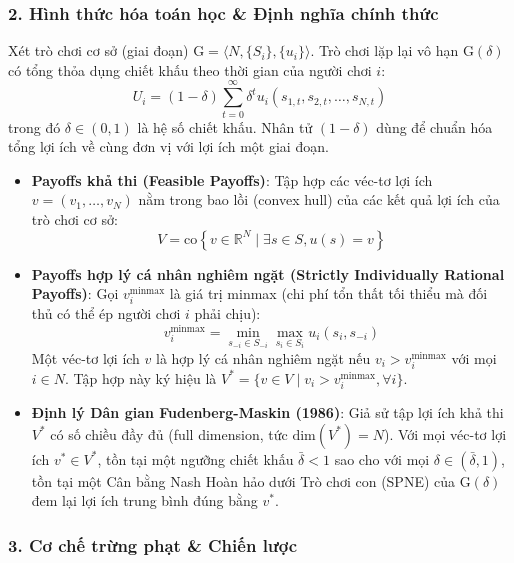 \documentclass[
]{article}
\begin{document}
\subsubsection{2. Hình thức hóa toán học \& Định nghĩa chính
thức}\label{huxecnh-thux1ee9c-huxf3a-touxe1n-hux1ecdc-ux111ux1ecbnh-nghux129a-chuxednh-thux1ee9c-1}

Xét trò chơi cơ sở (giai đoạn)
\(\text{G} = \langle N, \{S_i\}, \{u_i\} \rangle\). Trò chơi lặp lại vô
hạn \(\text{G}(\delta)\) có tổng thỏa dụng chiết khấu theo thời gian của
người chơi \(i\):
\[ U_i = (1 - \delta) \sum_{t=0}^{\infty} \delta^t u_i(s_{1,t}, s_{2,t}, \dots, s_{N,t}) \]
trong đó \(\delta \in (0,1)\) là hệ số chiết khấu. Nhân tử
\((1 - \delta)\) dùng để chuẩn hóa tổng lợi ích về cùng đơn vị với lợi
ích một giai đoạn.

\begin{itemize}
\item
  \textbf{Payoffs khả thi (Feasible Payoffs)}: Tập hợp các véc-tơ lợi
  ích \(v = (v_1, \dots, v_N)\) nằm trong bao lồi (convex hull) của các
  kết quả lợi ích của trò chơi cơ sở:
  \[ V = \text{co}\left\{ v \in \mathbb{R}^N \mid \exists s \in S, u(s) = v \right\} \]
\item
  \textbf{Payoffs hợp lý cá nhân nghiêm ngặt (Strictly Individually
  Rational Payoffs)}: Gọi \(v_i^{\text{minmax}}\) là giá trị minmax (chi
  phí tổn thất tối thiểu mà đối thủ có thể ép người chơi \(i\) phải
  chịu):
  \[ v_i^{\text{minmax}} = \min_{s_{-i} \in S_{-i}} \max_{s_i \in S_i} u_i(s_i, s_{-i}) \]
  Một véc-tơ lợi ích \(v\) là hợp lý cá nhân nghiêm ngặt nếu
  \(v_i > v_i^{\text{minmax}}\) với mọi \(i \in N\). Tập hợp này ký hiệu
  là \(V^* = \{v \in V \mid v_i > v_i^{\text{minmax}}, \forall i\}\).
\item
  \textbf{Định lý Dân gian Fudenberg-Maskin (1986)}: Giả sử tập lợi ích
  khả thi \(V^*\) có số chiều đầy đủ (full dimension, tức
  \(\text{dim}(V^*) = N\)). Với mọi véc-tơ lợi ích \(v^* \in V^*\), tồn
  tại một ngưỡng chiết khấu \(\bar{\delta} < 1\) sao cho với mọi
  \(\delta \in (\bar{\delta}, 1)\), tồn tại một Cân bằng Nash Hoàn hảo
  dưới Trò chơi con (SPNE) của \(\text{G}(\delta)\) đem lại lợi ích
  trung bình đúng bằng \(v^*\).
\end{itemize}

\subsubsection{3. Cơ chế trừng phạt \& Chiến
lược}\label{cux1a1-chux1ebf-trux1eebng-phux1ea1t-chiux1ebfn-lux1b0ux1ee3c}
\end{document}
